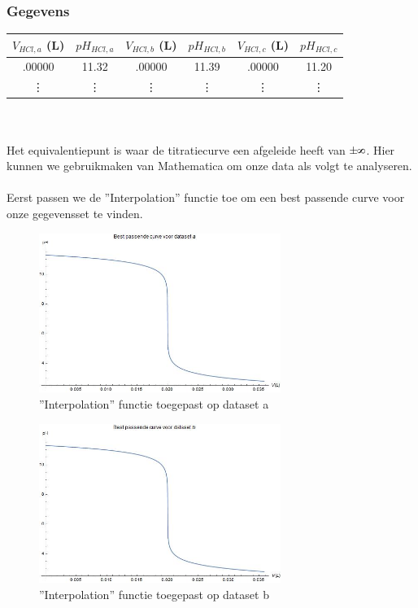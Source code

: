 \documentclass[11pt]{report}
\def\infinity{\rotatebox{90}{8}}
\begin{document}
\subsubsection{Gegevens}
\begin{tabular}{|c|c||c|c||c|c|}
    \hline
    $V_{HCl,a}$ (L) & $pH_{HCl,a}$ & $V_{HCl,b}$ (L) & $pH_{HCl,b}$ & $V_{HCl,c}$ (L) & $pH_{HCl,c}$ \\\hline
    .00000 & 11.32 & .00000 & 11.39 & .00000 & 11.20\\\hline
    \vdots & \vdots & \vdots & \vdots & \vdots & \vdots \\\hline
\end{tabular}\\\\
Het equivalentiepunt is waar de titratiecurve een afgeleide heeft van $\pm\infinity$. Hier kunnen we gebruikmaken van Mathematica om onze data als volgt te analyseren.\\\\
Eerst passen we de ''Interpolation'' functie toe om een best passende curve voor onze gegevensset te vinden.
\begin{figure}[H]
    \centering
    \includegraphics[width=0.7\textwidth]{a_interpolation.jpg}
    \caption{''Interpolation'' functie toegepast op dataset a}
\end{figure}
\begin{figure}[H]
    \centering
    \includegraphics[width=0.7\textwidth]{b_interpolation.jpg}
    \caption{''Interpolation'' functie toegepast op dataset b}
\end{figure}
\end{document}
